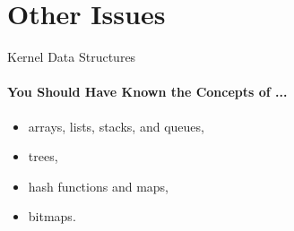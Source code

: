 \documentclass[10pt]{beamer}
\begin{document}

\section[7.Misc.]{Other Issues}
\begin{frame}{Kernel Data Structures}
\framesubtitle{You Should Have Known the Concepts of ...}
\begin{itemize}
\item arrays, lists, stacks, and queues,
\item trees,
\item hash functions and maps,
\item bitmaps.
\end{itemize}
\end{frame}
\end{document}
